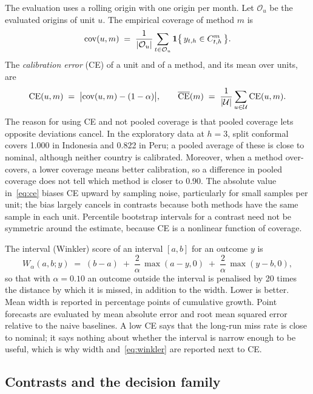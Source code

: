 The evaluation uses a rolling origin with one origin per month. Let $\mathcal O_u$ be the evaluated origins of unit $u$. The empirical coverage of method $m$ is
\begin{equation}\label{eq:cov}
\mathrm{cov}(u,m) \;=\; \frac{1}{|\mathcal O_u|}\sum_{t\in\mathcal O_u}\mathbf 1\bigl\{\,y_{t,h}\in C^{m}_{t,h}\,\bigr\}.
\end{equation}
The \emph{calibration error} (CE) of a unit and of a method, and its mean over units, are
\begin{equation}\label{eq:ce}
\mathrm{CE}(u,m) \;=\; \bigl|\mathrm{cov}(u,m)-(1-\alpha)\bigr|,\qquad
\overline{\mathrm{CE}}(m) \;=\; \frac{1}{|\mathcal U|}\sum_{u\in\mathcal U}\mathrm{CE}(u,m).
\end{equation}
The reason for using CE and not pooled coverage is that pooled coverage lets opposite deviations cancel. In the exploratory data at $h=3$, split conformal covers 1.000 in Indonesia and 0.822 in Peru; a pooled average of these is close to nominal, although neither country is calibrated. Moreover, when a method over-covers, a lower coverage means better calibration, so a difference in pooled coverage does not tell which method is closer to 0.90. The absolute value in~\eqref{eq:ce} biases CE upward by sampling noise, particularly for small samples per unit; the bias largely cancels in contrasts because both methods have the same sample in each unit. Percentile bootstrap intervals for a contrast need not be symmetric around the estimate, because CE is a nonlinear function of coverage.

The interval (Winkler) score \citep{winkler1972,gneiting2007scoring} of an interval $[a,b]$ for an outcome $y$ is
\begin{equation}\label{eq:winkler}
W_\alpha(a,b;y) \;=\; (b-a) \;+\; \frac{2}{\alpha}\,\max(a-y,0) \;+\; \frac{2}{\alpha}\,\max(y-b,0),
\end{equation}
so that with $\alpha=0.10$ an outcome outside the interval is penalised by 20 times the distance by which it is missed, in addition to the width. Lower is better. Mean width is reported in percentage points of cumulative growth. Point forecasts are evaluated by mean absolute error and root mean squared error relative to the naive baselines. A low CE says that the long-run miss rate is close to nominal; it says nothing about whether the interval is narrow enough to be useful, which is why width and~\eqref{eq:winkler} are reported next to CE.

\subsection{Contrasts and the decision family}\label{sec:contrasts}

